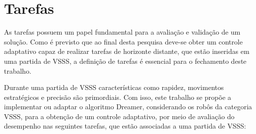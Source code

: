 





\section{Tarefas}
\label{sec:tarefas}

As tarefas possuem um papel fundamental para a avaliação e validação de um solução. Como é previsto que ao final desta pesquisa deve-se obter um controle adaptativo capaz de realizar tarefas de horizonte distante, que estão inseridas em uma partida de VSSS, a definição de tarefas é essencial para o fechamento deste trabalho.

Durante uma partida de VSSS características como rapidez, movimentos estratégicos e precisão são primordiais. Com isso, este trabalho se propõe a implementar ou adaptar o algoritmo Dreamer, considerando os robôs da categoria VSSS, para a obtenção de um controle adaptativo, por meio de avaliação do desempenho nas seguintes tarefas, que estão associadas a uma partida de VSSS:

